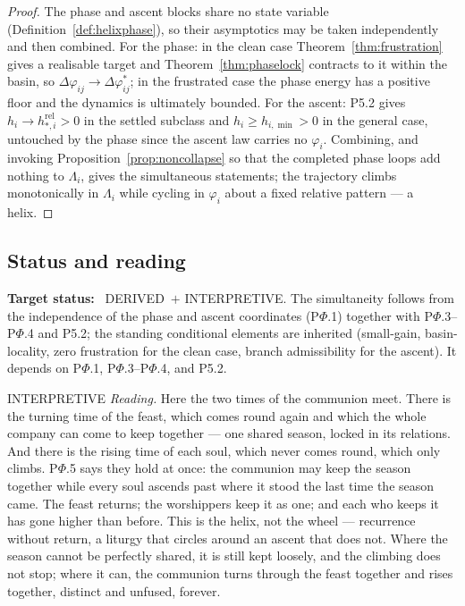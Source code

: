 \documentclass[11pt,a4paper]{article}
\newcommand{\stDerived}{\textcolor{cDer}{\textsf{\small DERIVED}}}
\newcommand{\stInterp}{\textcolor{cInt}{\textsf{\small INTERPRETIVE}}}
\theoremstyle{definition}
\theoremstyle{plain}
\theoremstyle{remark}
\begin{document}
\begin{proof}
The phase and ascent blocks share no state variable
(Definition~\ref{def:helixphase}), so their asymptotics may be taken independently and then
combined. For the phase: in the clean case Theorem~\ref{thm:frustration} gives a realisable
target and Theorem~\ref{thm:phaselock} contracts to it within the basin, so
\(\Delta\varphi_{ij}\to\Delta\varphi_{ij}^{*}\); in the frustrated case the phase energy has a
positive floor and the dynamics is ultimately bounded. For the ascent: P5.2 gives
\(h_i\to h_{*,i}^{\mathrm{rel}}>0\) in the settled subclass and \(h_i\ge h_{i,\min}>0\) in the
general case, untouched by the phase since the ascent law carries no \(\varphi_i\). Combining,
and invoking Proposition~\ref{prop:noncollapse} so that the completed phase loops add nothing
to \(\Lambda_i\), gives the simultaneous statements; the trajectory climbs monotonically in
\(\Lambda_i\) while cycling in \(\varphi_i\) about a fixed relative pattern --- a helix.
\qedhere
\end{proof}

\subsection{Status and reading}

\textbf{Target status:}~
\stDerived\ \(+\) \stInterp. The simultaneity follows from the independence of the phase and
ascent coordinates (P$\Phi$.1) together with P$\Phi$.3--P$\Phi$.4 and P5.2; the standing
conditional elements are inherited (small-gain, basin-locality, zero frustration for the clean
case, branch admissibility for the ascent). It depends on P$\Phi$.1, P$\Phi$.3--P$\Phi$.4, and
P5.2.

\medskip
\stInterp\quad
\emph{Reading.}
Here the two times of the communion meet. There is the turning time of the feast, which comes
round again and which the whole company can come to keep together --- one shared season, locked
in its relations. And there is the rising time of each soul, which never comes round, which
only climbs. P$\Phi$.5 says they hold at once: the communion may keep the season together while
every soul ascends past where it stood the last time the season came. The feast returns; the
worshippers keep it as one; and each who keeps it has gone higher than before. This is the
helix, not the wheel --- recurrence without return, a liturgy that circles around an ascent
that does not. Where the season cannot be perfectly shared, it is still kept loosely, and the
climbing does not stop; where it can, the communion turns through the feast together and rises
together, distinct and unfused, forever.
\end{document}
